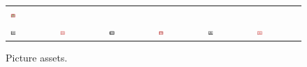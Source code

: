 \documentclass[book.tex]{subfiles}
\begin{document}
\begin{figure}[H]
\begin{table}[H]
\begin{tabularx}{\textwidth}[c]{XXXXXX}
  \includegraphics[width=0.15\textwidth]{screenshots_300dpi/game/picture36.jpg} \\
  \includegraphics[width=0.15\textwidth]{screenshots_300dpi/game/picture37.jpg} &
  \includegraphics[width=0.15\textwidth]{screenshots_300dpi/game/picture38.jpg} &
  \includegraphics[width=0.15\textwidth]{screenshots_300dpi/game/picture39.jpg} &
  \includegraphics[width=0.15\textwidth]{screenshots_300dpi/game/picture40.jpg} &
  \includegraphics[width=0.15\textwidth]{screenshots_300dpi/game/picture41.jpg} &
  \includegraphics[width=0.15\textwidth]{screenshots_300dpi/game/picture42.jpg} \\
  \end{tabularx}
  \end{table}
  \caption{Picture assets.}
  \label{fig:picture_assets}
 \end{figure} 
 
\end{document}
